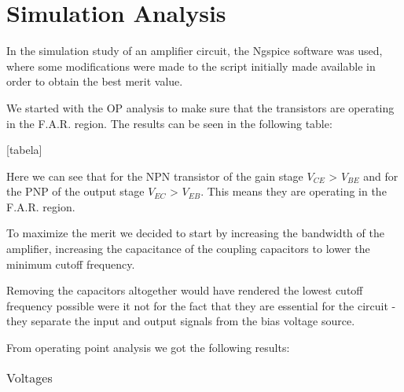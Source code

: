 \section{Simulation Analysis}
\label{sec:simulation} 

In the simulation study of an amplifier circuit, the Ngspice software was used, where some modifications were made to the script initially made available in order to obtain the best merit value.

We started with the OP analysis to make sure that the transistors are operating in the F.A.R. region. The results can be seen in the following table:

[tabela]


Here we can see that for the NPN transistor of the gain stage $V_{CE}$ > $V_{BE}$ and for the PNP of the output stage $V_{EC}$ > $V_{EB}$. This means they are operating in the F.A.R. region.

To maximize the merit we decided to start by increasing the bandwidth of the amplifier, increasing the capacitance of the coupling capacitors to lower the minimum cutoff frequency.

Removing the capacitors altogether would have rendered the lowest cutoff frequency possible were it not for the fact that they are essential for the circuit - they separate the input and output signals from the bias voltage source.









































From operating point analysis we got the following results:
\FloatBarrier
\begin{table}[h]
  \centering
  \begin{tabular}{|c|c|c|c|c|}
    \hline    
    
    \hline
  \end{tabular}
  \caption{Voltages}
  \label{tab:Spice1}
\end{table}
\FloatBarrier  

